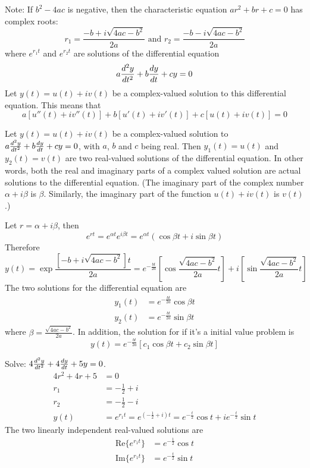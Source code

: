 \documentclass[12pt]{article}
\begin{document}
Note: If $b^2 - 4ac$ is negative, then the characteristic equation $ar^2 + br + c = 0$ has complex roots: $$r_1 = \frac{-b + i\sqrt{4ac - b^2}}{2a} \text{ and } r_2 = \frac{-b - i\sqrt{4ac - b^2}}{2a} $$ where $e^{r_1t}$ and $e^{r_2t}$ are solutions of the differential equation $$a\frac{d^2y}{dt^2} + b\frac{dy}{dt} + cy = 0$$ 
Let $y(t) = u(t) + iv(t)$ be a complex-valued solution to this differential equation. This means that $$ a[u''(t) + iv''(t)] + b[u'(t) + iv'(t)] + c[u(t) + iv(t)] = 0$$ 
\begin{theorem} Let $y(t) = u(t) + iv(t)$ be a complex-valued solution to $a\frac{d^2y}{dt^2} + b\frac{dy}{dt} + cy = 0$, with $a$, $b$ and $c$ being real. Then $y_1(t) = u(t)$ and $y_2(t) = v(t)$ are two real-valued solutions of the differential equation. In other words, both the real and imaginary parts of a complex valued solution are actual solutions to the differential equation. (The imaginary part of the complex number $\alpha + i\beta$ is $\beta$. Similarly, the imaginary part of the function $u(t) + iv(t)$ is $v(t)$.) \end{theorem} 
Let $r = \alpha + i\beta$, then $$e^{rt} = e^{\alpha t}e^{i \beta t} = e^{\alpha t}(\cos \beta t + i\sin \beta t) $$ Therefore $$y(t) = \exp{\frac{[-b + i\sqrt{4ac - b^2}]t}{2a}} = e^{-\frac{bt}{2a}}[\cos \frac{\sqrt{4ac - b^2}}{2a}t] + i[\sin \frac{\sqrt{4ac - b^2}}{2a}t]$$ The two solutions for the differential equation are $$\begin{aligned} y_1(t) &= e^{-\frac{bt}{2a}}\cos \beta t \\ y_2(t) &= e^{-\frac{bt}{2a}}\sin \beta t \end{aligned} $$ where $\beta = \frac{\sqrt{4ac - b^2}}{2a}$. In addition, the solution for if it's a initial value problem is $$y(t) = e^{-\frac{bt}{2a}}[c_1\cos \beta t + c_2\sin \beta t]$$ 
\begin{example} Solve: $4\frac{d^2y}{dt^2} + 4\frac{dy}{dt} + 5y = 0$. $$\begin{aligned} 4r^2 + 4r + 5 &= 0 \\ r_1 &= -\frac{1}{2} + i \\ r_2 &= -\frac{1}{2} - i \\ y(t) &= e^{r_1t} = e^{(-\frac{1}{2} + i)t} = e^{-\frac{t}{2}}\cos t + ie^{-\frac{t}{2}}\sin t \end{aligned} $$ 
The two linearly independent real-valued solutions are $$\begin{aligned} \text{Re}\{e^{r_1t}\} &= e^{-\frac{1}{2}}\cos t \\ \text{Im}\{e^{r_1t}\} &= e^{-\frac{t}{2}} \sin t \end{aligned} $$ \end{example} 
\end{document}
